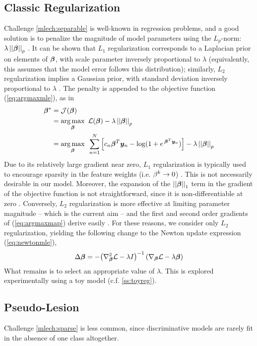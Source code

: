 \subsection{Classic Regularization}
Challenge \ref{mlech:separable} is well-known in regression problems, and a good solution is to penalize the magnitude of model parameters using the $L_p$-norm: $\lambda\left|\left|\bm{\beta}\right|\right|_p$ \cite{Zou2005}. It can be shown that $L_1$ regularization corresponds to a Laplacian prior on elements of $\bm{\beta}$, with scale parameter inversely proportional to $\lambda$ (equivalently, this assumes that the model error follows this distribution); similarly, $L_2$ regularization implies a Gaussian prior, with standard deviation inversely proportional to $\lambda$ \cite{Zou2005}. The penalty is appended to the objective function (\ref{eq:argmaxmle}), as in 
\begin{align}
\bm{\beta}^* &= \mathcal{J}(\bm{\beta})\nonumber\\
&= \underset{\bm{\beta}}{\arg\max}\enspace\mathcal{L}(\bm{\beta}) - \lambda\left|\left|\bm{\beta}\right|\right|_p \nonumber\\
&= \underset{\bm{\beta}}{\arg\max}\enspace\sum_{n=1}^{N} \Big[ c_n \bm{\beta}^T\bm{y}_n - \log (1+e^{\thinspace\bm{\beta}^T\bm{y}_n}) \Big] - \lambda\left|\left|\bm{\beta}\right|\right|_p
\label{eq:argmaxmap}
\end{align}
Due to its relatively large gradient near zero, $L_1$ regularization is typically used to encourage sparsity in the feature weights (i.e. $\beta^k\rightarrow0$) \cite{Tibshirani1996}. This is not necessarily desirable in our model. Moreover, the expansion of the $\left|\left|\bm{\beta}\right|\right|_1$ term in the gradient of the objective function is not straightforward, since it is non-differentiable at zero \cite{Tibshirani1996,Lee2006}. Conversely, $L_2$ regularization is more effective at limiting parameter magnitude -- which is the current aim -- and the first and second order gradients of (\ref{eq:argmaxmap}) derive easily \cite{Minka2003}. For these reasons, we consider only $L_2$ regularization, yielding the following change to the Newton update expression (\ref{eq:newtonmle}),
\begin{equation}
\Delta\bm{\beta} = -{\left(\nabla^2_{\bm{\beta}}\mathcal{L}-\lambda I\right)}^{-1}\left(\nabla_{\bm{\beta}}\mathcal{L}-\lambda\bm{\beta}\right)
\label{eq:newtonmap}
\end{equation}
What remains is to select an appropriate value of $\lambda$. This is explored experimentally using a toy model (c.f. \ref{ss:toyreg}).
\subsection{Pseudo-Lesion}
Challenge \ref{mlech:sparse} is less common, since discriminative models are rarely fit in the absence of one class altogether. 

